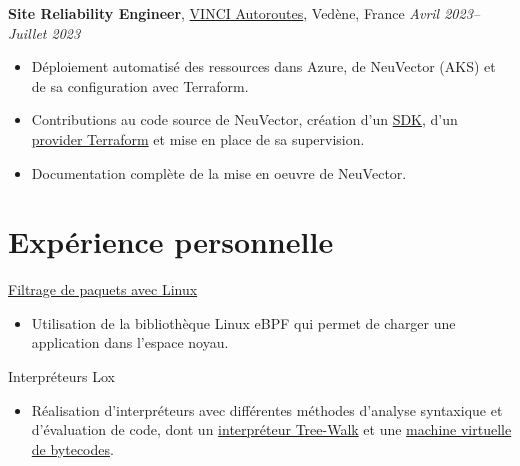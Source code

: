 \documentclass[margin,line]{../res}
\begin{document}
\begin{resume}
	{\bf Site Reliability Engineer}, \href{https://www.vinci-autoroutes.com}{VINCI Autoroutes}, Vedène, France
	\hfill {\it Avril 2023--Juillet 2023}
	\vspace*{.05in}
	\begin{itemize}
		\item Déploiement automatisé des ressources dans Azure, de NeuVector (AKS) et de sa configuration avec Terraform.
		\item Contributions au code source de NeuVector, création d'un \href{https://github.com/theobori/go-neuvector}{SDK}, d'un \href{https://github.com/theobori/terraform-provider-neuvector}{provider Terraform} et mise en place de sa supervision.
		\item Documentation complète de la mise en oeuvre de NeuVector.
	\end{itemize}


	\section{\sc Expérience personnelle}

	\href{https://github.com/theobori/tinyfilter}{Filtrage de paquets avec Linux}
	\begin{itemize}
		\item Utilisation de la bibliothèque Linux eBPF qui permet de charger une application dans l'espace noyau.
	\end{itemize}

	Interpréteurs Lox
	\begin{itemize}
		\item Réalisation d'interpréteurs avec différentes méthodes d'analyse syntaxique et d'évaluation de code, dont un \href{https://github.com/theobori/tinylox}{interpréteur Tree-Walk} et une \href{https://github.com/theobori/lox-virtual-machine}{machine virtuelle de bytecodes}.
	\end{itemize}



\end{resume}
\end{document}
